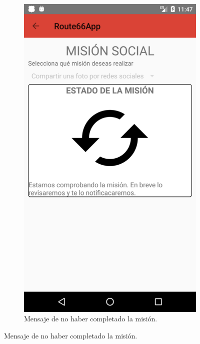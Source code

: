 \documentclass[twoside]{report}
\begin{document}
\begin{figure}[H]
\begin{center}
\begin{subfigure}[t]{.3\linewidth}
		\includegraphics[scale=0.25]{images/userguide/27.png}
		\caption{Mensaje de no haber completado la misión.}
	\end{subfigure}\hspace{2mm}%

\end{center}
\end{figure}
\end{document}
